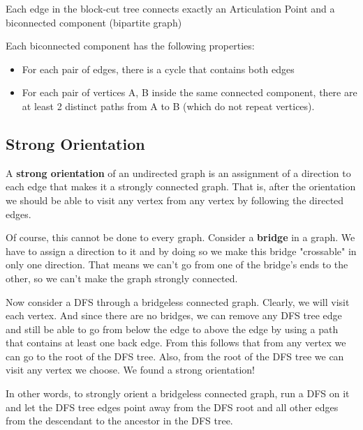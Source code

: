 	Each edge in the block-cut tree connects exactly an Articulation Point and a biconnected component (bipartite graph)

	Each biconnected component has the following properties:

	\begin{itemize}
		\item For each pair of edges, there is a cycle that contains both edges
		\item For each pair of vertices {A, B} inside the same connected component, there are at least 2 distinct paths from A to B (which do not repeat vertices).
	\end{itemize}

	

	\subsection{Strong Orientation}

	A \textbf{strong orientation} of an undirected graph is an assignment of a direction to each edge that makes it a strongly connected graph.
	That is, after the orientation we should be able to visit any vertex from any vertex by following the directed edges.

	Of course, this cannot be done to every graph. Consider a \textbf{bridge} in a graph.
	We have to assign a direction to it and by doing so we make this bridge "crossable" in only one direction.
	That means we can't go from one of the bridge's ends to the other, so we can't make the graph strongly connected.

	Now consider a DFS through a bridgeless connected graph. Clearly, we will visit each vertex.
	And since there are no bridges, we can remove any DFS tree edge and still be able to go from below the edge to
	above the edge by using a path that contains at least one back edge. 
	From this follows that from any vertex we can go to the root of the DFS tree. 
	Also, from the root of the DFS tree we can visit any vertex we choose. We found a strong orientation!

	In other words, to strongly orient a bridgeless connected graph, 
	run a DFS on it and let the DFS tree edges point away from the DFS root and all other edges 
	from the descendant to the ancestor in the DFS tree.


